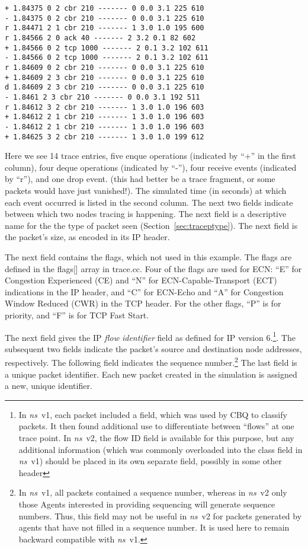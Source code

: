 \begin{small}
\begin{verbatim}
+ 1.84375 0 2 cbr 210 ------- 0 0.0 3.1 225 610
- 1.84375 0 2 cbr 210 ------- 0 0.0 3.1 225 610
r 1.84471 2 1 cbr 210 ------- 1 3.0 1.0 195 600
r 1.84566 2 0 ack 40 ------- 2 3.2 0.1 82 602
+ 1.84566 0 2 tcp 1000 ------- 2 0.1 3.2 102 611
- 1.84566 0 2 tcp 1000 ------- 2 0.1 3.2 102 611
r 1.84609 0 2 cbr 210 ------- 0 0.0 3.1 225 610
+ 1.84609 2 3 cbr 210 ------- 0 0.0 3.1 225 610
d 1.84609 2 3 cbr 210 ------- 0 0.0 3.1 225 610
- 1.8461 2 3 cbr 210 ------- 0 0.0 3.1 192 511
r 1.84612 3 2 cbr 210 ------- 1 3.0 1.0 196 603
+ 1.84612 2 1 cbr 210 ------- 1 3.0 1.0 196 603
- 1.84612 2 1 cbr 210 ------- 1 3.0 1.0 196 603
+ 1.84625 3 2 cbr 210 ------- 1 3.0 1.0 199 612
\end{verbatim}
\end{small}
Here we see 14 trace entries, five enque operations (indicated by ``+''
in the first column), four deque operations (indicated by ``-''),
four receive events (indicated by ``r''), and one drop event.
(this had better be a trace fragment, or
some packets would have just vanished!).
The simulated time (in seconds) at which each event occurred is listed
in the second column.
The next two fields indicate between which two nodes tracing is happening.
The next field is 
a descriptive name for the the type of packet seen 
(Section~\ref{sec:traceptype}).
The next field is the packet's size, as encoded in its IP header.

The next field contains the flags, which not used in this example.
The flags are defined in the flags[] array in trace.cc. 
Four of the flags are used for ECN:
``E'' for Congestion Experienced (CE) and ``N'' for 
ECN-Capable-Transport (ECT) indications
in the IP header, and 
``C'' for ECN-Echo and ``A'' for Congestion Window Reduced (CWR) 
in the TCP header.
For the other flags, ``P'' is for priority, and ``F'' is for TCP Fast Start.

The next field gives the IP {\em flow identifier} field as defined
for IP version 6.\footnote{In \emph{ns}~v1, each packet included a 
field, which was used by CBQ to classify packets.
It then found additional use to differentiate between
``flows'' at one trace point.  In \emph{ns}~v2, the flow ID field is available
for this purpose, but any additional information (which was commonly overloaded
into the class field in \emph{ns}~v1) should be placed in its own separate field,
possibly in some other header}.
The subsequent two fields indicate the packet's source and destination
node addresses, respectively.
The following field indicates the sequence number.\footnote{In \emph{ns}~v1,
all packets contained a sequence number, whereas in \emph{ns}~v2 only those
Agents interested in providing sequencing will generate sequence numbers.
Thus, this field may not be useful in \emph{ns}~v2 for packets generated by
agents that have not filled in a sequence number.  It is used here
to remain backward compatible with \emph{ns}~v1.}
The last field is a unique packet identifier.  Each new packet
created in the simulation is assigned a new, unique identifier.


